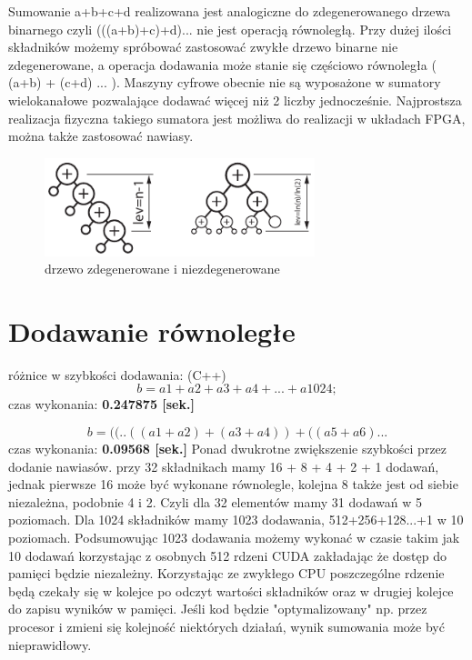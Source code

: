 Sumowanie a+b+c+d realizowana jest analogiczne do zdegenerowanego drzewa binarnego czyli 
(((a+b)+c)+d)... nie jest operacją równoległą. Przy dużej ilości składników możemy spróbować zastosować zwykłe drzewo binarne nie zdegenerowane, a operacja dodawania może stanie się częściowo równoległa  ( (a+b)  +  (c+d) ... ).
Maszyny cyfrowe obecnie nie są wyposażone w sumatory wielokanałowe pozwalające dodawać więcej niż 2 liczby jednocześnie. Najprostsza realizacja fizyczna takiego sumatora jest możliwa do realizacji w układach FPGA, można także zastosować nawiasy.

\begin{figure}[h]
	\centering \includegraphics[width=0.7\textwidth]{gfx/sum.pdf} 
	\caption{ drzewo zdegenerowane i niezdegenerowane}
	\label{rys:operacjesynch}
\end{figure}

\break

 
\section{Dodawanie równoległe}
różnice w szybkości dodawania: (C++) 
\begin{equation*}
b=a1+a2+a3+a4+...+a1024;
\end{equation*}
czas wykonania: \textbf{0.247875 [sek.]}

\begin{equation*}
b=((..((a1+a2)+(a3+a4))+((a5+a6) ...
\end{equation*}
czas wykonania: \textbf{0.09568 [sek.]} 
\newline 
\newline Ponad dwukrotne zwiększenie szybkości przez dodanie nawiasów. 
przy 32 składnikach mamy 16 + 8 + 4 + 2 + 1 dodawań, jednak pierwsze 16 może być wykonane równolegle, kolejna 8 także jest od siebie niezależna, podobnie 4 i 2. Czyli dla 32 elementów  mamy 31 dodawań w 5 poziomach. Dla 1024 składników mamy 1023 dodawania, 512+256+128...+1 w 10 poziomach. Podsumowując 1023 dodawania możemy wykonać w czasie takim jak 10 dodawań korzystając z osobnych 512 rdzeni CUDA zakładając że dostęp do pamięci będzie niezależny. Korzystając ze zwykłego CPU poszczególne rdzenie będą czekały się w kolejce po odczyt wartości składników oraz w drugiej kolejce do zapisu wyników w pamięci. Jeśli kod będzie "optymalizowany" np. przez procesor i zmieni się kolejność niektórych działań, wynik sumowania może być nieprawidłowy.

